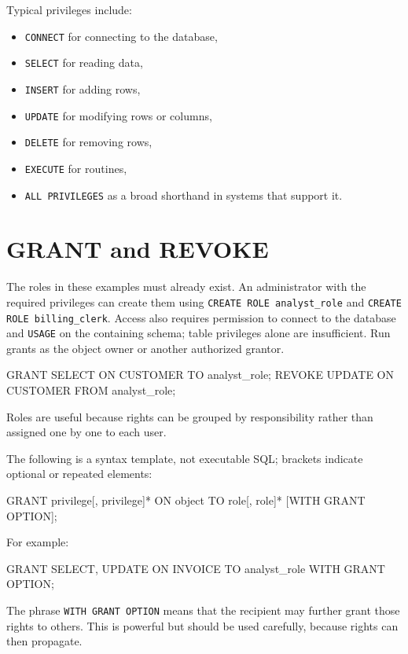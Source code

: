 \documentclass[11pt,a4paper,openany]{book}
\begin{document}
Typical privileges include:
\begin{itemize}
\item \texttt{CONNECT} for connecting to the database,
\item \texttt{SELECT} for reading data,
\item \texttt{INSERT} for adding rows,
\item \texttt{UPDATE} for modifying rows or columns,
\item \texttt{DELETE} for removing rows,
\item \texttt{EXECUTE} for routines,
\item \texttt{ALL PRIVILEGES} as a broad shorthand in systems that support it.
\end{itemize}

\section{GRANT and REVOKE}
The roles in these examples must already exist. An administrator with the required privileges can create them using \texttt{CREATE ROLE analyst\_role} and \texttt{CREATE ROLE billing\_clerk}. Access also requires permission to connect to the database and \texttt{USAGE} on the containing schema; table privileges alone are insufficient. Run grants as the object owner or another authorized grantor.

\begin{codesql}
GRANT SELECT ON CUSTOMER TO analyst_role;
REVOKE UPDATE ON CUSTOMER FROM analyst_role;
\end{codesql}

Roles are useful because rights can be grouped by responsibility rather than assigned one by one to each user.

The following is a syntax template, not executable SQL; brackets indicate optional or repeated elements:
\begin{codesql}
GRANT privilege[, privilege]*
ON object
TO role[, role]*
[WITH GRANT OPTION];
\end{codesql}

For example:
\begin{codesql}
GRANT SELECT, UPDATE
ON INVOICE
TO analyst_role
WITH GRANT OPTION;
\end{codesql}

The phrase \texttt{WITH GRANT OPTION} means that the recipient may further grant those rights to others. This is powerful but should be used carefully, because rights can then propagate.
\end{document}
